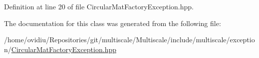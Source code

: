 Definition at line 20 of file Circular\-Mat\-Factory\-Exception.\-hpp.



The documentation for this class was generated from the following file\-:\begin{DoxyCompactItemize}
\item 
/home/ovidiu/\-Repositories/git/multiscale/\-Multiscale/include/multiscale/exception/\hyperlink{CircularMatFactoryException_8hpp}{Circular\-Mat\-Factory\-Exception.\-hpp}\end{DoxyCompactItemize}
